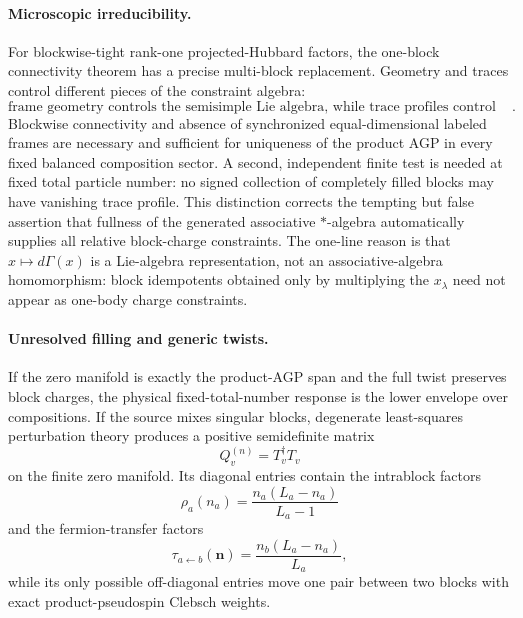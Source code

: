 \documentclass[11pt]{article}
\numberwithin{equation}{section}
\newcommand{\bn}{\mathbf n}
\begin{document}
\paragraph{Microscopic irreducibility.}
For blockwise-tight rank-one projected-Hubbard factors, the one-block connectivity theorem has a precise multi-block replacement.  Geometry and traces control different pieces of the constraint algebra:
\begin{equation}
 \boxed{
 \text{frame geometry controls the semisimple Lie algebra,
 while trace profiles control its center}.}
 \label{eq:geometry-center-slogan}
\end{equation}
Blockwise connectivity and absence of synchronized equal-dimensional labeled frames are necessary and sufficient for uniqueness of the product AGP in every fixed balanced composition sector.  A second, independent finite test is needed at fixed total particle number: no signed collection of completely filled blocks may have vanishing trace profile.  This distinction corrects the tempting but false assertion that fullness of the generated associative $*$-algebra automatically supplies all relative block-charge constraints.  The one-line reason is that $x\mapsto d\Gamma(x)$ is a Lie-algebra representation, not an associative-algebra homomorphism: block idempotents obtained only by multiplying the $x_\lambda$ need not appear as one-body charge constraints.

\paragraph{Unresolved filling and generic twists.}
If the zero manifold is exactly the product-AGP span and the full twist preserves block charges, the physical fixed-total-number response is the lower envelope over compositions.  If the source mixes singular blocks, degenerate least-squares perturbation theory produces a positive semidefinite matrix
\begin{equation}
 Q_v^{(n)}=T_v^\dagger T_v
 \label{eq:headline-Q}
\end{equation}
on the finite zero manifold.  Its diagonal entries contain the intrablock factors
\begin{equation}
 \rho_a(n_a)=\frac{n_a(L_a-n_a)}{L_a-1}
 \label{eq:rho-intro}
\end{equation}
and the fermion-transfer factors
\begin{equation}
 \tau_{a\leftarrow b}(\bn)
 =
 \frac{n_b(L_a-n_a)}{L_a},
 \label{eq:tau-intro}
\end{equation}
while its only possible off-diagonal entries move one pair between two blocks with exact product-pseudospin Clebsch weights.
\end{document}
